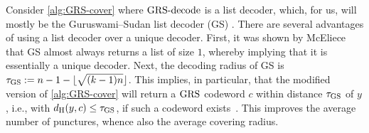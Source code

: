 \documentclass[conference]{IEEEtran}
\begin{document}
Consider \autoref{alg:GRS-cover} where $\operatorname{GRS-decode}$ is a list decoder, which, for us, will mostly be the Guruswami--Sudan list decoder (GS) \cite{Guruswami06}. 
There are several advantages of using a list decoder over a unique decoder. 
First, it was shown by McEliece \cite{McEliece03, McEliece03-1} that GS almost always returns a list of size $1$, whereby implying that it is essentially a unique decoder. 
Next, the decoding radius of GS is $\tau_{\operatorname{GS}} := n - 1 - \lfloor \sqrt{(k - 1) n} \rfloor$. 
This implies, in particular, that the modified version of \autoref{alg:GRS-cover} will return a $\operatorname{GRS}$ codeword $c$ within distance $\tau_{\operatorname{GS}}$ of $y$, i.e., with $d_{{\rm H}}(y, c) \le \tau_{\operatorname{GS}}$, if such a codeword exists~\cite{McEliece03-1}. 
This improves the average number of punctures, whence also the average covering radius. 
\end{document}
